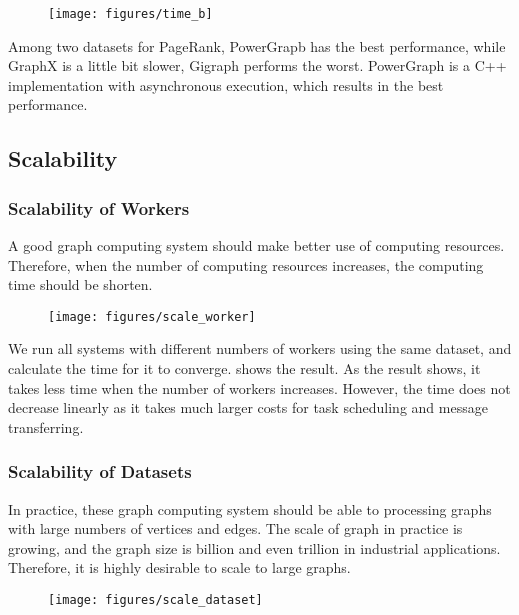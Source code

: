 \begin{figure}
  \texttt{[image: figures/time\_b]}
  \caption{}
  \label{fig:time:b}
\end{figure}

Among two datasets for PageRank, PowerGrapb has the best performance,
while GraphX is a little bit slower, Gigraph performs the worst.
PowerGraph is a C++ implementation with asynchronous execution, which
results in the best performance.

\subsection{Scalability} \label{subsec:scalability}
\subsubsection{Scalability of Workers}
A good graph computing system should make better use of computing
resources. Therefore, when the number of computing resources increases,
the computing time should be shorten.

\begin{figure}
  \texttt{[image: figures/scale\_worker]}
  \caption{}
  \label{fig:scale:worker}
\end{figure}

We run all systems with different numbers of workers using the same dataset,
and calculate the time for it to converge. 
shows the result. As the result shows, it takes less time
when the number of workers increases. However, the time
does not decrease linearly as it takes much larger costs
for task scheduling and message transferring.

\subsubsection{Scalability of Datasets}
In practice, these graph computing system should be able to processing
graphs with large numbers of vertices and edges. The scale of graph
in practice is growing, and the graph size is billion and even trillion
in industrial applications. Therefore, it is highly desirable to
scale to large graphs.

\begin{figure}
  \texttt{[image: figures/scale\_dataset]}
  \caption{}
  \label{}
\end{figure}


